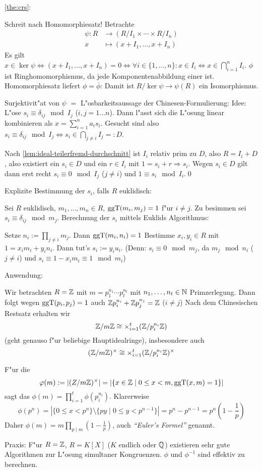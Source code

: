 \proof \ref{the:crs}:{
  Schreit nach Homomorphiesatz! Betrachte
  \begin{align*}
    \psi : R &\to (R/I_1\times \cdots\times R/I_n)\\
    x&\mapsto (x+ I_1,\ldots, x+I_n)
    \end{align*}
  Es gilt $x\in\ker\psi\iff (x+I_1,\ldots,x+I_n)=0\iff \forall i\in\{1,\ldots,n\}:x\in I_i\iff x\in\bigcap_{i=1}^n I_i$.
  $\phi$ ist Ringhomomorphismus, da jede Komponentenabbildung einer ist.
  Homomorphiesatz liefert $\phi=\overline \phi$: Damit ist
  $R/ \ker \psi\to\psi(R)$ ein Isomorphismus.
  
  Surjektivit"at von $\psi$ $=$ L"osbarkeitsaussage der Chinesen-Formulierung:
  Idee: L"ose $s_i\equiv \delta_{ij} \mod I_j$ ($i,j=1\ldots n$).
  Dann l"asst sich die L"osung linear kombinieren als $x=\sum_{i=1}^n a_is_i$.
  Gesucht sind also $s_i\equiv \delta_{ij} \mod I_j\iff s_i \in \bigcap_{j\neq i} I_j=:D$.
  
  Nach \ref{lem:ideal-teilerfremd-durchschnitt} ist $I_i$ relativ
  prim zu $D$, also $R=I_i+D$, also existiert ein $s_i\in D$ und ein $r\in I_i$ mit
  $1=s_i+r \Rightarrow s_i$. Wegen $s_i\in D$ gilt dann erst recht $s_i\equiv 0\mod I_j$ ($j\neq i$)
  und $1\equiv s_i\mod I_i$.\qed
  }
\remark Explizite Bestimmung der $s_i$, falls $R$ euklidisch:{
  Sei $R$ euklidisch, $m_1,\ldots,m_n\in R$, $\operatorname{ggT}(m_i,m_j)=1$ f"ur $i\neq j$.
  Zu besimmen sei $s_i\equiv \delta_{ij}\mod m_j$. Berechnung der $s_i$ mittels
  Euklids Algorithmus:
  
  Setze $n_i:=\prod_{j\neq i} m_j$. Dann $\operatorname{ggT}(m_i,n_i)=1$ Bestimme 
  $x_i,y_i\in R$ mit $1=x_im_i+y_in_i$. Dann tut's $s_i:=y_iu_i$.
  (Denn: $s_i\equiv 0\mod m_j$, da $m_j\mod n_i$ ($j\neq i$) und
  $s_i\equiv 1-x_im_i \equiv 1 \mod m_i$)
  }
\remark Anwendung:{
  Wir betrachten $R=\mathbb Z$ mit $m=p_1^{n_1}\cdots p_t^{n_t}$ mit $n_1,\ldots,n_t\in \mathbb N$
  Primzerlegung. Dann folgt wegen
  $\operatorname{ggT}(p_i,p_j)=1$ auch $\mathbb Z p_i^{n_i}+\mathbb Z p_j^{n_j}=\mathbb Z$ ($i\neq j$)
  Nach dem Chinesischen Restsatz erhalten wir
  \[\mathbb Z/m\mathbb Z\cong \times_{i=1}^t (\mathbb Z/ p_i^{n_i}\mathbb Z)
    \]
  (geht genauso f"ur beliebige Hauptidealringe), insbesondere auch
  \[(\mathbb Z/m\mathbb Z)^\times\cong \times_{i=1}^t (\mathbb Z/ p_i^{n_i}\mathbb Z)^\times
    \]
  
  F"ur die \emph{} 
  \[\varphi(m):=|(Z/m\mathbb Z)^\times|=|\{x\in\mathbb Z\mid 0\leq x<m, \operatorname{ggT}(x,m)=1\}|
    \]
  sagt das $\phi(m)=\prod_{i=1}^t \phi(p_i^{n_i})$. 
  Klarerweise
  \[\phi(p^n)=|\{0\leq x<p^n\}\setminus\{py\mid 0\leq y< p^{n-1}\}|=p^n-p^{n-1}=p^n(1-\frac1p)
    \]
  Daher $\phi(m)=m\prod_{p\mid m} (1-\frac 1p)$, auch \emph{``Euler's Formel''}
  genannt.
  
  Praxis: F"ur $R=\mathbb Z$, $R=K[X]$ ($K$ endlich oder $\mathbb Q$) existieren
  sehr gute Algorithmen zur L"osung simultaner Kongruenzen.
  $\phi$ und $\phi^{-1}$ sind effektiv zu berechnen.
  }
